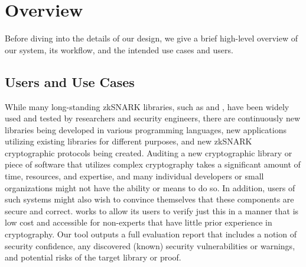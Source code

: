 \section{Overview}
\label{sec:snarkprobe-overview}

Before diving into the details of our design, we give a brief high-level overview of our \snarkprobe system, its workflow, and the intended use cases and users.

\subsection{Users and Use Cases}

While many long-standing zkSNARK libraries, such as \libsnark and \bellman, have been widely used and tested by researchers and security engineers, there are continuously new libraries being developed in various programming languages, new applications utilizing existing libraries for different purposes, and new zkSNARK cryptographic protocols being created. Auditing a new cryptographic library or piece of software that utilizes complex cryptography takes a significant amount of time, resources, and expertise, and many individual developers or small organizations might not have the ability or means to do so.  In addition, users of such systems might also wish to convince themselves that these components are secure and correct.
\snarkprobe works to allow its users to verify just this in a manner that is low cost and accessible for non-experts that have little prior experience in cryptography. Our tool outputs a full evaluation report that includes a notion of security confidence, any discovered (known) security vulnerabilities or warnings, and potential risks of the target library or proof.

